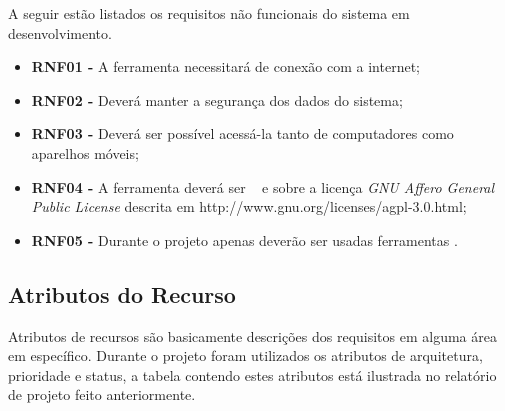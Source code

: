 A seguir estão listados os requisitos não funcionais do sistema em desenvolvimento.

\begin{itemize}
	\item \textbf{RNF01 - }A ferramenta necessitará de conexão com a internet;
	\item \textbf{RNF02 - }Deverá manter a segurança dos dados do sistema;
	\item \textbf{RNF03 - }Deverá ser possível acessá-la tanto de computadores como aparelhos móveis;
	\item \textbf{RNF04 - }A ferramenta deverá ser \opensource~ e sobre a licença \textit{GNU Affero General Public License} descrita em http://www.gnu.org/licenses/agpl-3.0.html;
	\item \textbf{RNF05 - }Durante o projeto apenas deverão ser usadas ferramentas \opensource.
\end{itemize}


\subsection{Atributos do Recurso}

Atributos de recursos são basicamente descrições dos requisitos em alguma área em específico. Durante o projeto foram utilizados os atributos de arquitetura, prioridade e status, a tabela contendo estes atributos está ilustrada no relatório de projeto feito anteriormente.